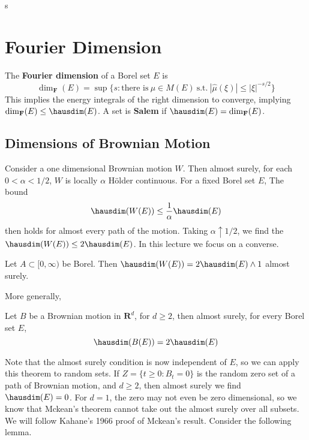 \begin{theorem}[Marstrand]
	s
\end{theorem}






\chapter{Fourier Dimension}

The {\bf Fourier dimension} of a Borel set $E$ is
%
\[ \dim_{\mathbf{F}}(E) = \sup \{s : \text{there is}\ \mu \in M(E)\ \text{s.t.}\ |\widehat{\mu}(\xi)| \leq |\xi|^{-s/2}  \} \]
%
This implies the energy integrals of the right dimension to converge, implying $\dim_{\mathbf{F}}(E) \leq \hausdim(E)$. A set is {\bf Salem} if $\hausdim(E) = \dim_{\mathbf{F}}(E)$.

\section{Dimensions of Brownian Motion}

Consider a one dimensional Brownian motion $W$. Then almost surely, for each $0 < \alpha < 1/2$, $W$ is locally $\alpha$ H\"{o}lder continuous. For a fixed Borel set $E$, The bound
%
\[ \hausdim(W(E)) \leq \frac{1}{\alpha} \hausdim(E) \]
%
then holds for almost every path of the motion. Taking $\alpha \uparrow 1/2$, we find the $\hausdim(W(E)) \leq 2 \hausdim(E)$. In this lecture we focus on a converse.

\begin{theorem}[Mckean, 1955]
	Let $A \subset [0,\infty)$ be Borel. Then $\hausdim(W(E)) = 2\hausdim(E) \wedge 1$ almost surely.
\end{theorem}

More generally,

\begin{theorem}
	Let $B$ be a Brownian motion in $\mathbf{R}^d$, for $d \geq 2$, then almost surely, for every Borel set $E$,
	\[\hausdim(B(E)) = 2\hausdim(E) \]
\end{theorem}

Note that the almost surely condition is now independent of $E$, so we can apply this theorem to random sets. If $Z = \{ t \geq 0: B_t = 0 \}$ is the random zero set of a path of Brownian motion, and $d \geq 2$, then almost surely we find $\hausdim(E) = 0$. For $d = 1$, the zero may not even be zero dimensional, so we know that Mckean's theorem cannot take out the almost surely over all subsets. We will follow Kahane's 1966 proof of Mckean's result. Consider the following lemma.

